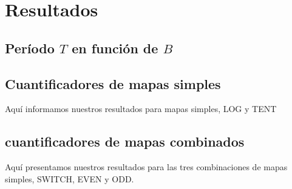 \section{Resultados}\label{sec:resultados}



\subsection{Período $T$ en función de $B$}



\subsection {Cuantificadores de mapas simples}\label{subsec:SimpleMaps}
Aquí informamos nuestros resultados para mapas simples, LOG y TENT



 

\subsection{cuantificadores de mapas combinados}\label{subsec:SecSwitch}
Aquí presentamos nuestros resultados para las tres combinaciones de mapas simples, SWITCH, EVEN y ODD.




